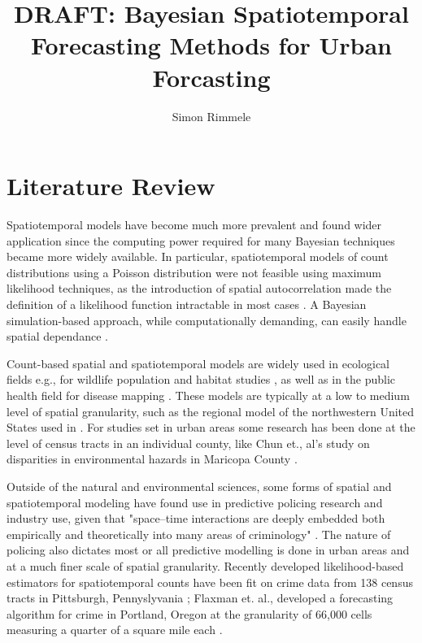 \documentclass{article}
\title{DRAFT: Bayesian Spatiotemporal Forecasting Methods for Urban Forcasting}
\author{Simon Rimmele}
\begin{document}
\maketitle{}
\section{Literature Review}

Spatiotemporal models have become much more prevalent and found wider application since the computing power required for many Bayesian techniques became more widely available. In particular, spatiotemporal models of count distributions using a Poisson distribution were not feasible using maximum likelihood techniques, as the introduction of spatial autocorrelation made the definition of a likelihood function intractable in most cases \cite{cressie1993statistics}. A Bayesian simulation-based approach, while computationally demanding, can easily handle spatial dependance \cite{blangiardo_2015}.

\par

Count-based spatial and spatiotemporal models are widely used in ecological fields e.g., for wildlife population and habitat studies \cite{cobi_2008}, as well as in the public health field for disease mapping \cite{schrodle_2011}. These models are typically at a low to medium level of spatial granularity, such as the regional model of the northwestern United States used in \cite{cobi_2008}. For studies set in urban areas some research has been done at the level of census tracts in an individual county, like Chun et., al's study on disparities in environmental hazards in Maricopa County \cite{chun_2012}. \par

Outside of the natural and environmental sciences, some forms of spatial and spatiotemporal modeling have found use in predictive policing research and industry use, given that "space–time interactions are deeply embedded both empirically and theoretically into many areas of criminology" \cite{li_2014}. The nature of policing also dictates most or all predictive modelling is done in urban areas and at a much finer scale of spatial granularity. Recently developed likelihood-based estimators for spatiotemporal counts have been fit on crime data from 138 census tracts in Pittsburgh, Pennyslyvania \cite{liesenfeld_2017}; Flaxman et. al., developed a forecasting algorithm for crime in Portland, Oregon at the granularity of 66,000 cells measuring a quarter of a square mile each \cite{flaxman_2018}.
 \par
\end{document}
